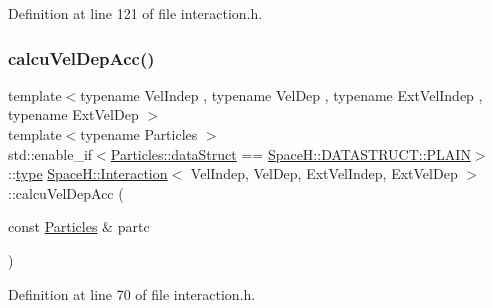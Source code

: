 Definition at line 121 of file interaction.\+h.

\mbox{\label{class_space_h_1_1_interaction_aa7aa7148a435c420e86821ae319e68b0}} 
\subsubsection{\texorpdfstring{calcu\+Vel\+Dep\+Acc()}{calcuVelDepAcc()}\hspace{0.1cm}{\footnotesize\ttfamily [1/2]}}
{\footnotesize\ttfamily template$<$typename Vel\+Indep , typename Vel\+Dep , typename Ext\+Vel\+Indep , typename Ext\+Vel\+Dep $>$ \\
template$<$typename Particles $>$ \\
std\+::enable\+\_\+if$<$\mbox{\hyperlink{class_vel_indep_particles_a6d357b21c216a2b079b1927c18de0b8f}{Particles\+::data\+Struct}} == \mbox{\hyperlink{namespace_space_h_a0af19f79a6498e99dbda772053d44a72af62eb0bf5e5c72e80983fbbac1cb70e5}{Space\+H\+::\+D\+A\+T\+A\+S\+T\+R\+U\+C\+T\+::\+P\+L\+A\+IN}}$>$\+::\mbox{\hyperlink{class_space_h_1_1_interaction_a0bed18b8b8efcb42be264a255f931be6}{type}} \mbox{\hyperlink{class_space_h_1_1_interaction}{Space\+H\+::\+Interaction}}$<$ Vel\+Indep, Vel\+Dep, Ext\+Vel\+Indep, Ext\+Vel\+Dep $>$\+::calcu\+Vel\+Dep\+Acc (\begin{DoxyParamCaption}\item[{const \mbox{\hyperlink{struct_particles}{Particles}} \&}]{partc }\end{DoxyParamCaption})\hspace{0.3cm}{\ttfamily [inline]}}



Definition at line 70 of file interaction.\+h.

